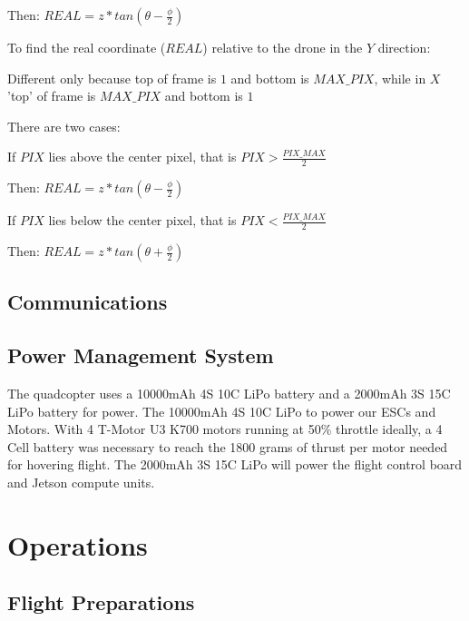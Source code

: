 \documentclass[12pt,letterpaper]{article}
\newcommand\tab[1][1cm]{\hspace*{#1}}
\begin{document}
							\tab \tab \tab \tab Then: $REAL = z * tan(\theta - \frac{\phi}{2})$

				\tab To find the real coordinate ($REAL$) relative to the drone in the $Y$ direction:

				\tab Different only because top of frame is $1$ and bottom is $MAX\_PIX$, while in $X$ 'top' of frame is $MAX\_PIX$ and bottom is $1$

					\tab \tab There are two cases:

						\tab \tab \tab If $PIX$ lies above the center pixel, that is $PIX > \frac{PIX\_MAX}{2}$

							\tab \tab \tab \tab Then: $REAL = z * tan(\theta - \frac{\phi}{2})$

						\tab \tab \tab If $PIX$ lies below the center pixel, that is $PIX < \frac{PIX\_MAX}{2}$

							\tab \tab \tab \tab Then: $REAL = z * tan(\theta + \frac{\phi}{2})$

	\subsection*{Communications}
	\subsection*{Power Management System}
		The quadcopter uses a 10000mAh 4S 10C LiPo battery and a 2000mAh 3S 15C LiPo battery for power. The 10000mAh 4S 10C LiPo to power our ESCs and Motors. With 4 T-Motor U3 K700 motors running at 50\% throttle ideally, a 4 Cell battery was necessary to reach the 1800 grams of thrust per motor needed for hovering flight. The 2000mAh 3S 15C LiPo will power the flight control board and Jetson compute units.

\section*{Operations}
	\subsection*{Flight Preparations}
\end{document}
